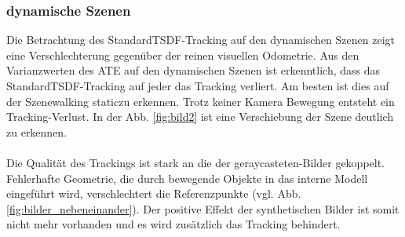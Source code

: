 \documentclass[12pt,DIV=15,BCOR=15mm,twoside,headsepline,abstract=true,listof=totoc,bibliography=totoc]{scrreprt}
\theoremstyle{remark}    %
\begin{document}
    \subsubsection{dynamische Szenen}
    Die Betrachtung des \glqq Standard\grqq \ac{TSDF}-Tracking auf den dynamischen Szenen zeigt eine Verschlechterung gegenüber der reinen visuellen Odometrie.
    Aus den Varianzwerten des \ac{ATE} auf den dynamischen Szenen ist erkenntlich, dass das \glqq Standard\grqq \ac{TSDF}-Tracking auf jeder das Tracking 
    verliert. Am besten ist dies auf der Szene\glqq walking static\grqq zu erkennen. Trotz keiner Kamera Bewegung entsteht ein Tracking-Verlust. In der Abb. \ref{fig:bild2} ist eine 
    Verschiebung der Szene deutlich zu erkennen.\\\\
    Die Qualität des Trackings ist stark an die der geraycasteten-Bilder gekoppelt. Fehlerhafte Geometrie, die durch bewegende Objekte in das interne 
    Modell eingeführt wird, verschlechtert die Referenzpunkte (vgl. Abb. \ref{fig:bilder_nebeneinander}). Der positive Effekt der synthetischen Bilder ist somit nicht mehr 
    vorhanden und es wird zusätzlich das Tracking behindert.\\\\
\end{document}
